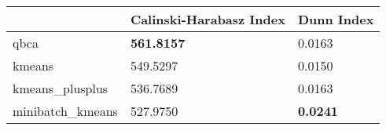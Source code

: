 \begin{table}[htbp]
\centering
\begin{tabular}{lll}
\toprule
 & Calinski-Harabasz Index & Dunn Index \\
\midrule
qbca & \textbf{561.8157} & 0.0163 \\
kmeans & 549.5297 & 0.0150 \\
kmeans_plusplus & 536.7689 & 0.0163 \\
minibatch_kmeans & 527.9750 & \textbf{0.0241} \\
\bottomrule
\end{tabular}
\end{table}
